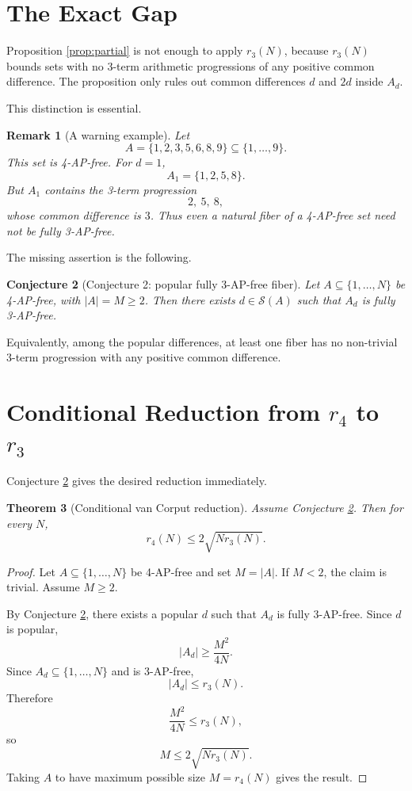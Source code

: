 \documentclass[11pt]{article}
\newtheorem{theorem}{Theorem}[section]
\newtheorem{conjecture}[theorem]{Conjecture}
\newtheorem{remark}[theorem]{Remark}
\newcommand{\calS}{\mathcal{S}}
\begin{document}
\section{The Exact Gap}

Proposition \ref{prop:partial} is not enough to apply \(r_3(N)\), because
\(r_3(N)\) bounds sets with no 3-term arithmetic progressions of any positive
common difference.  The proposition only rules out common differences \(d\) and
\(2d\) inside \(A_d\).

This distinction is essential.

\begin{remark}[A warning example]
Let
\[
  A=\{1,2,3,5,6,8,9\}\subseteq\{1,\ldots,9\}.
\]
This set is 4-AP-free.  For \(d=1\),
\[
  A_1=\{1,2,5,8\}.
\]
But \(A_1\) contains the 3-term progression
\[
  2,\ 5,\ 8,
\]
whose common difference is \(3\).  Thus even a natural fiber of a 4-AP-free set
need not be fully 3-AP-free.
\end{remark}

The missing assertion is the following.

\begin{conjecture}[Conjecture 2: popular fully 3-AP-free fiber]
\label{conj:c2}
Let \(A\subseteq\{1,\ldots,N\}\) be 4-AP-free, with \(|A|=M\geq 2\).  Then
there exists \(d\in\calS(A)\) such that \(A_d\) is fully 3-AP-free.
\end{conjecture}

Equivalently, among the popular differences, at least one fiber has no
non-trivial 3-term progression with any positive common difference.

\section{Conditional Reduction from \(r_4\) to \(r_3\)}

Conjecture \ref{conj:c2} gives the desired reduction immediately.

\begin{theorem}[Conditional van Corput reduction]
\label{thm:conditional_vc}
Assume Conjecture \ref{conj:c2}.  Then for every \(N\),
\[
  r_4(N)\leq 2\sqrt{N r_3(N)}.
\]
\end{theorem}

\begin{proof}
Let \(A\subseteq\{1,\ldots,N\}\) be 4-AP-free and set \(M=|A|\).  If \(M<2\), the
claim is trivial.  Assume \(M\geq 2\).

By Conjecture \ref{conj:c2}, there exists a popular \(d\) such that \(A_d\) is
fully 3-AP-free.  Since \(d\) is popular,
\[
  |A_d|\geq \frac{M^2}{4N}.
\]
Since \(A_d\subseteq \{1,\ldots,N\}\) and is 3-AP-free,
\[
  |A_d|\leq r_3(N).
\]
Therefore
\[
  \frac{M^2}{4N}\leq r_3(N),
\]
so
\[
  M\leq 2\sqrt{N r_3(N)}.
\]
Taking \(A\) to have maximum possible size \(M=r_4(N)\) gives the result.
\end{proof}
\end{document}
